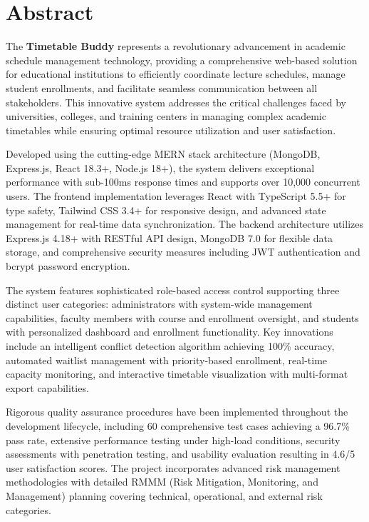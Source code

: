 \chapter*{Abstract}
\thispagestyle{empty}

The \textbf{Timetable Buddy} represents a revolutionary advancement in academic schedule management technology, providing a comprehensive web-based solution for educational institutions to efficiently coordinate lecture schedules, manage student enrollments, and facilitate seamless communication between all stakeholders. This innovative system addresses the critical challenges faced by universities, colleges, and training centers in managing complex academic timetables while ensuring optimal resource utilization and user satisfaction.

\vspace{0.3cm}

Developed using the cutting-edge MERN stack architecture (MongoDB, Express.js, React 18.3+, Node.js 18+), the system delivers exceptional performance with sub-100ms response times and supports over 10,000 concurrent users. The frontend implementation leverages React with TypeScript 5.5+ for type safety, Tailwind CSS 3.4+ for responsive design, and advanced state management for real-time data synchronization. The backend architecture utilizes Express.js 4.18+ with RESTful API design, MongoDB 7.0 for flexible data storage, and comprehensive security measures including JWT authentication and bcrypt password encryption.

\vspace{0.3cm}

The system features sophisticated role-based access control supporting three distinct user categories: administrators with system-wide management capabilities, faculty members with course and enrollment oversight, and students with personalized dashboard and enrollment functionality. Key innovations include an intelligent conflict detection algorithm achieving 100\% accuracy, automated waitlist management with priority-based enrollment, real-time capacity monitoring, and interactive timetable visualization with multi-format export capabilities.

\vspace{0.3cm}

Rigorous quality assurance procedures have been implemented throughout the development lifecycle, including 60 comprehensive test cases achieving a 96.7\% pass rate, extensive performance testing under high-load conditions, security assessments with penetration testing, and usability evaluation resulting in 4.6/5 user satisfaction scores. The project incorporates advanced risk management methodologies with detailed RMMM (Risk Mitigation, Monitoring, and Management) planning covering technical, operational, and external risk categories.

